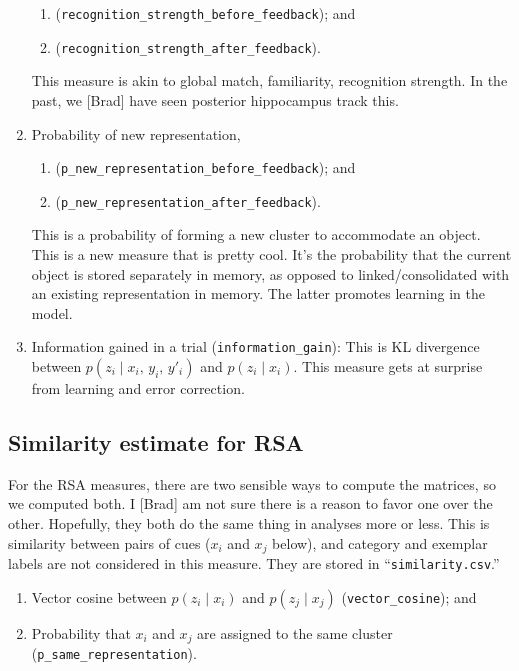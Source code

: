 \documentclass[11pt,a4paper]{article}
\begin{document}
\begin{enumerate}
    \begin{enumerate}
        \item (\texttt{recognition\_strength\_before\_feedback}); and
        \item (\texttt{recognition\_strength\_after\_feedback}).
    \end{enumerate}

        This measure is akin to global match, familiarity, recognition strength. In the past, we
        [Brad] have seen posterior hippocampus track this.

    \item Probability of new representation,

    \begin{enumerate}
        \item (\texttt{p\_new\_representation\_before\_feedback}); and
        \item (\texttt{p\_new\_representation\_after\_feedback}).
    \end{enumerate}

        This is a probability of forming a new cluster to accommodate an object. This is a new
        measure that is pretty cool.  It's the probability that the current object is stored
        separately in memory, as opposed to linked/consolidated with an existing representation in
        memory. The latter promotes learning in the model.

    \item Information gained in a trial (\texttt{information\_gain}): This is KL divergence between
    $p(z_{i} \;\vert\; x_{i}, \, y_{i},\, y'_{i})$ and $p(z_{i} \;\vert\; x_{i})$.  This measure
    gets at surprise from learning and error correction.

\end{enumerate}


\subsection{Similarity estimate for RSA}

For the RSA measures, there are two sensible ways to compute the matrices, so we computed both. I
[Brad] am not sure there is a reason to favor one over the other. Hopefully, they both do the same
thing in analyses more or less.  This is similarity between pairs of cues ($x_{i}$ and $x_{j}$
below), and category and exemplar labels are not considered in this measure. They are stored in
``\texttt{similarity.csv}.''

\begin{enumerate}

    \item Vector cosine between $p(z_{i} \;\vert\; x_{i})$ and $p(z_{j} \;\vert\; x_{j})$
    (\texttt{vector\_cosine}); and

    \item Probability that $x_{i}$ and $x_{j}$ are assigned to the same cluster
    (\texttt{p\_same\_representation}).

\end{enumerate}
\end{document}

